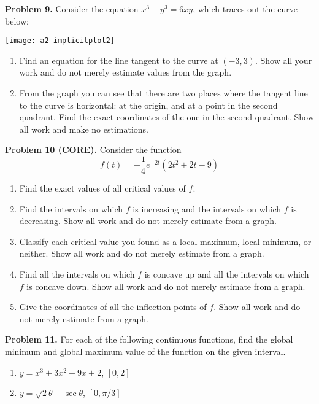 \documentclass[addpoints]{exam}
\begin{document}
\vspace{0.3in}

\noindent
\textbf{Problem 9.} Consider the equation $x^3 - y^3 = 6xy$, which traces out the curve below: 
\begin{center}
	\texttt{[image: a2-implicitplot2]}
\end{center}

	\begin{enumerate}
		\item Find an equation for the line tangent to the curve at $(-3,3)$. Show all your work and do not merely estimate values from the graph. 
		\item From the graph you can see that there are two places where the tangent line to the curve is horizontal: at the origin, and at a point in the second quadrant. Find the exact coordinates of the one in the second quadrant. Show all work and make no estimations. 
	\end{enumerate}


\vspace{0.3in}

\noindent
\textbf{Problem 10 (CORE).} Consider the function 
$$f(t) = -\frac{1}{4} e^{-2t} (2t^2 + 2t - 9)$$
	\begin{enumerate}
		\item Find the exact values of all critical values of $f$. 
		\item Find the intervals on which $f$ is increasing and the intervals on which $f$ is decreasing. Show all work and do not merely estimate from a graph. 
		\item Classify each critical value you found as a local maximum, local minimum, or neither. Show all work and do not merely estimate from a graph. 
		\item Find all the intervals on which $f$ is concave up and all the intervals on which $f$ is concave down. Show all work and do not merely estimate from a graph. 
		\item Give the coordinates of all the inflection points of $f$. Show all work and do not merely estimate from a graph. 
	\end{enumerate}


\vspace{0.3in}

\noindent
\textbf{Problem 11.} For each of the following continuous functions, find the global minimum and global maximum value of the function on the given interval. 
	\begin{enumerate}
		\item $y = x^3 + 3x^2 - 9x + 2$, $[0,2]$
		\item $y = \sqrt{2} \theta - \sec \theta$, $[0, \pi/3]$
	\end{enumerate}
\end{document}

